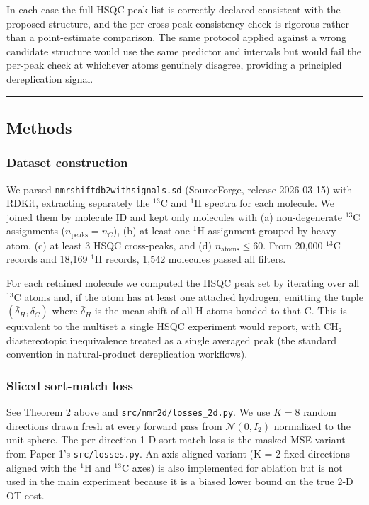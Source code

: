In each case the full HSQC peak list is correctly declared consistent with the proposed structure, and the per-cross-peak consistency check is rigorous rather than a point-estimate comparison. The same protocol applied against a wrong candidate structure would use the same predictor and intervals but would fail the per-peak check at whichever atoms genuinely disagree, providing a principled dereplication signal.

\begin{center}\rule{0.5\linewidth}{0.5pt}\end{center}

\subsection{Methods}\label{methods}

\subsubsection{Dataset construction}\label{dataset-construction}

We parsed \texttt{nmrshiftdb2withsignals.sd} (SourceForge, release 2026-03-15) with RDKit, extracting separately the \(^{13}\)C and \(^{1}\)H spectra for each molecule. We joined them by molecule ID and kept only molecules with (a) non-degenerate \(^{13}\)C assignments (\(n_{\text{peaks}} = n_C\)), (b) at least one \(^{1}\)H assignment grouped by heavy atom, (c) at least 3 HSQC cross-peaks, and (d) \(n_{\text{atoms}} \leq 60\). From 20,000 \(^{13}\)C records and 18,169 \(^{1}\)H records, 1,542 molecules passed all filters.

For each retained molecule we computed the HSQC peak set by iterating over all \(^{13}\)C atoms and, if the atom has at least one attached hydrogen, emitting the tuple \((\bar{\delta}_H, \delta_C)\) where \(\bar{\delta}_H\) is the mean shift of all H atoms bonded to that C. This is equivalent to the multiset a single HSQC experiment would report, with CH₂ diastereotopic inequivalence treated as a single averaged peak (the standard convention in natural-product dereplication workflows).

\subsubsection{Sliced sort-match loss}\label{sliced-sort-match-loss}

See Theorem 2 above and \texttt{src/nmr2d/losses\_2d.py}. We use \(K = 8\) random directions drawn fresh at every forward pass from \(\mathcal{N}(0, I_2)\) normalized to the unit sphere. The per-direction 1-D sort-match loss is the masked MSE variant from Paper 1's \texttt{src/losses.py}. An axis-aligned variant (K = 2 fixed directions aligned with the \(^{1}\)H and \(^{13}\)C axes) is also implemented for ablation but is not used in the main experiment because it is a biased lower bound on the true 2-D OT cost.


